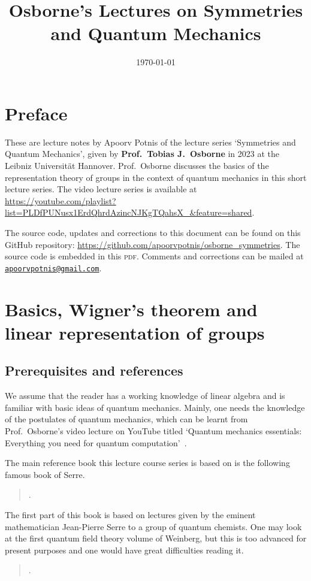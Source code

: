 \documentclass[a4 paper, 12pt]{book}
\title{Osborne's Lectures on Symmetries and Quantum Mechanics}
\author{}
\date{\today}
\theoremstyle{definition}
\begin{document}
	\hypertarget{TitlePage}{}
	\maketitle

	\chapter*{Preface}
	\hypertarget{Preface}{}
	These are lecture notes by Apoorv Potnis of the lecture series `Symmetries and Quantum Mechanics', given by \textbf{Prof.\ Tobias J.\ Osborne} in 2023 at the Leibniz Universität Hannover. Prof.\ Osborne discusses the basics of the representation theory of groups in the context of quantum mechanics in this short lecture series. The video lecture series is available at \url{https://youtube.com/playlist?list=PLDfPUNusx1ErdQhrdAzincNJKgTQahsX_&feature=shared}.

	The source code, updates and corrections to this document can be found on this GitHub repository: \url{https://github.com/apoorvpotnis/osborne_symmetries}. The source code is embedded in this \textsc{pdf}. Comments and corrections can be mailed at \href{mailto:apoorvpotnis@gmail.com}{\texttt{apoorvpotnis@gmail.com}}.
	\clearpage

	\hypertarget{Contents}{}
	\tableofcontents

	\chapter{Basics, Wigner's theorem and linear representation of groups}

	\section{Prerequisites and references}

	We assume that the reader has a working knowledge of linear algebra and is familiar with basic ideas of quantum mechanics. Mainly, one needs the knowledge of the postulates of quantum mechanics, which can be learnt from Prof.\ Osborne's video lecture on YouTube titled `Quantum mechanics essentials: Everything you need for quantum computation'~\cite{Osborne_quantum_essentials}.

	The main reference book this lecture course series is based on is the following famous book of Serre.\begin{quote}.\end{quote}The first part of this book is based on lectures given by the eminent mathematician Jean-Pierre Serre to a group of quantum chemists. One may look at the first quantum field theory volume of Weinberg, but this is too advanced for present purposes and one would have great difficulties reading it.\begin{quote}.\end{quote}
\end{document}
